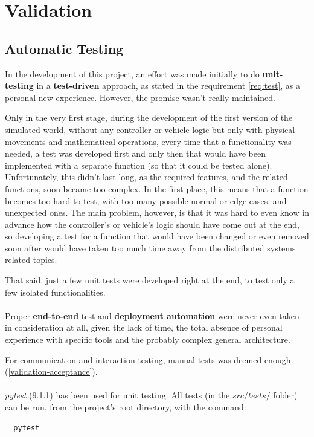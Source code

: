 \section{Validation}\label{validation}

\subsection{Automatic Testing}

In the development of this project, an effort was made initially to do
\textbf{unit-testing} in a \textbf{test-driven} approach, as stated in the
requirement \ref{req:test}, as a personal new experience. However, the promise
wasn't really maintained.

Only in the very first stage, during the development of the first version of the
simulated world, without any controller or vehicle logic but only with physical
movements and mathematical operations, every time that a functionality was
needed, a test was developed first and only then that would have been
implemented with a separate function (so that it could be tested alone).
Unfortunately, this didn't last long, as the required features, and the related
functions, soon became too complex. In the first place, this means that a
function becomes too hard to test, with too many possible normal or edge cases,
and unexpected ones. The main problem, however, is that it was hard to even know
in advance how the controller's or vehicle's logic should have come out at the
end, so developing a test for a function that would have been changed or even
removed soon after would have taken too much time away from the distributed
systems related topics.

That said, just a few unit tests were developed right at the end, to test only a
few isolated functionalities.
\\
\\
Proper \textbf{end-to-end} test and \textbf{deployment automation} were never
even taken in consideration at all, given the lack of time, the total absence of
personal experience with specific tools and the probably complex general
architecture.

For communication and interaction testing, manual tests was deemed enough
(\ref{validation-acceptance}).
\\
\\
\textit{pytest} (9.1.1) has been used for unit testing. All tests (in the
$src/tests/$ folder) can be run, from the project's root directory, with the
command:
\begin{verbatim}
  pytest
\end{verbatim}

